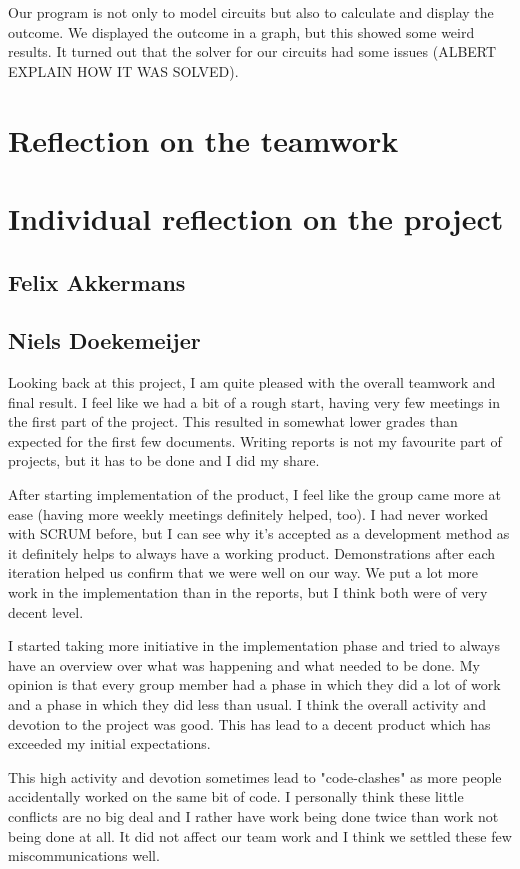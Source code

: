 \documentclass[a4paper]{article}
\begin{document}
Our program is not only to model circuits but also to calculate and display the outcome. We displayed the outcome in a graph, but this showed some weird results. It turned out that the solver for our circuits had some issues (ALBERT EXPLAIN HOW IT WAS SOLVED).

\section{Reflection on the teamwork}

\section{Individual reflection on the project} %
\subsection{Felix Akkermans}
\subsection{Niels Doekemeijer}
Looking back at this project, I am quite pleased with the overall teamwork and final result. I feel like we had a bit of a rough start, having very few meetings in the first part of the project. This resulted in somewhat lower grades than expected for the first few documents. Writing reports is not my favourite part of projects, but it has to be done and I did my share.

After starting implementation of the product, I feel like the group came more at ease (having more weekly meetings definitely helped, too). I had never worked with SCRUM before, but I can see why it's accepted as a development method as it definitely helps to always have a working product. Demonstrations after each iteration helped us confirm that we were well on our way. We put a lot more work in the implementation than in the reports, but I think both were of very decent level.

I started taking more initiative in the implementation phase and tried to always have an overview over what was happening and what needed to be done. My opinion is that every group member had a phase in which they did a lot of work and a phase in which they did less than usual. I think the overall activity and devotion to the project was good. This has lead to a decent product which has exceeded my initial expectations.

This high activity and devotion sometimes lead to "code-clashes" as more people accidentally worked on the same bit of code. I personally think these little conflicts are no big deal and I rather have work being done twice than work not being done at all. It did not affect our team work and I think we settled these few miscommunications well.
\end{document}
